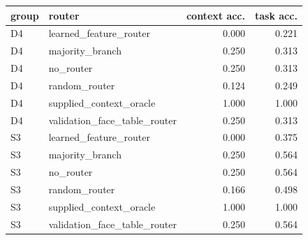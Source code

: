 \begin{tabular}{llrr}
\toprule
group & router & context acc. & task acc.\\
\midrule
D4 & learned\_feature\_router & 0.000 & 0.221\\
D4 & majority\_branch & 0.250 & 0.313\\
D4 & no\_router & 0.250 & 0.313\\
D4 & random\_router & 0.124 & 0.249\\
D4 & supplied\_context\_oracle & 1.000 & 1.000\\
D4 & validation\_face\_table\_router & 0.250 & 0.313\\
S3 & learned\_feature\_router & 0.000 & 0.375\\
S3 & majority\_branch & 0.250 & 0.564\\
S3 & no\_router & 0.250 & 0.564\\
S3 & random\_router & 0.166 & 0.498\\
S3 & supplied\_context\_oracle & 1.000 & 1.000\\
S3 & validation\_face\_table\_router & 0.250 & 0.564\\
\bottomrule
\end{tabular}
